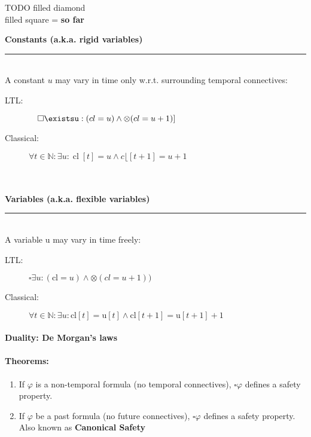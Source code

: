  TODO filled diamond\\
 filled square = \textbf{so far}
 \begin{minipage}{0.5\linewidth}
    \centering      
    \def\svgwidth{\linewidth}
        
\end{minipage}


\begin{multicols}{2}
 \textbf{Constants (a.k.a. rigid variables)}  \\ \rule{\linewidth}{0.4pt} \\
 A constant $u$ may vary in time only w.r.t. surrounding temporal connectives:
 \begin{description}
    \item[LTL:] $\quad \square \existsu:(cl=u) \wedge \otimes(c l=u+1)]$
    \item[Classical:] $ \forall t \in \mathbb{N}: \exists u: \operatorname{cl}[t]=u \wedge c\lfloor[t+1]=u+1$
\end{description}{}
 \columnbreak 
 \\ \\ \textbf{Variables (a.k.a. flexible variables)}  \\ \rule{\linewidth}{0.4pt}  \\
 A variable u may vary in time freely: 
 \begin{description}
     \item[LTL:] $\square \exists u:(\mathrm{cl}=u) \wedge \otimes(c l=u+1))$
     \item[Classical:] $\forall t \in \mathbb{N}: \exists u: \mathrm{cl}[t]=\mathrm{u}[t] \wedge \mathrm{cl}[t+1]=\mathrm{u}[t+1]+1$
 \end{description}{}
 \end{multicols}
 \paragraph{Duality: De Morgan’s laws}
 \begin{minipage}{0.5\linewidth}
    \centering      
    \def\svgwidth{\linewidth}
        
\end{minipage}

\paragraph{Theorems:}
\begin{enumerate}
    \item[] If $\varphi$ is a non-temporal formula (no temporal connectives), $\square \varphi$ defines a safety property.
    \item[] If $\varphi$ be a past formula (no future connectives), $\square \varphi$ defines a safety property. Also known as \textbf{Canonical Safety}
\end{enumerate}{}
